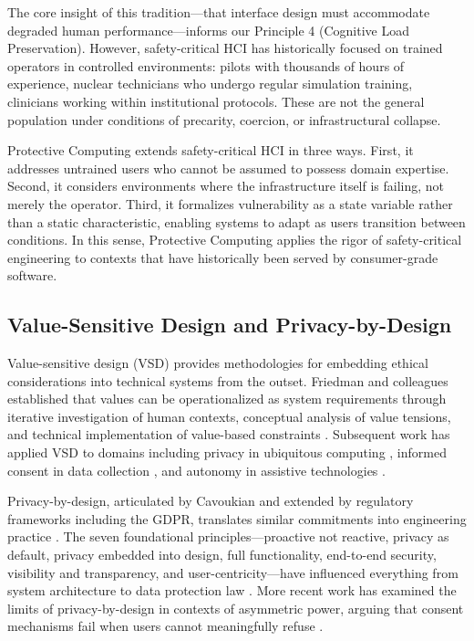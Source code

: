 \documentclass[acmsmall,review]{acmart}
\begin{document}
The core insight of this tradition---that interface design must accommodate degraded human performance---informs our Principle 4 (Cognitive Load Preservation). However, safety-critical HCI has historically focused on trained operators in controlled environments: pilots with thousands of hours of experience, nuclear technicians who undergo regular simulation training, clinicians working within institutional protocols. These are not the general population under conditions of precarity, coercion, or infrastructural collapse.

Protective Computing extends safety-critical HCI in three ways. First, it addresses untrained users who cannot be assumed to possess domain expertise. Second, it considers environments where the infrastructure itself is failing, not merely the operator. Third, it formalizes vulnerability as a state variable rather than a static characteristic, enabling systems to adapt as users transition between conditions. In this sense, Protective Computing applies the rigor of safety-critical engineering to contexts that have historically been served by consumer-grade software.

\subsection{Value-Sensitive Design and Privacy-by-Design}

Value-sensitive design (VSD) provides methodologies for embedding ethical considerations into technical systems from the outset. Friedman and colleagues established that values can be operationalized as system requirements through iterative investigation of human contexts, conceptual analysis of value tensions, and technical implementation of value-based constraints \cite{Friedman2006,Friedman2019}. Subsequent work has applied VSD to domains including privacy in ubiquitous computing \cite{Shilton2013}, informed consent in data collection \cite{Obar2020}, and autonomy in assistive technologies \cite{vanWynsberghe2015}.

Privacy-by-design, articulated by Cavoukian and extended by regulatory frameworks including the GDPR, translates similar commitments into engineering practice \cite{Cavoukian2009,EuropeanParliament2016}. The seven foundational principles---proactive not reactive, privacy as default, privacy embedded into design, full functionality, end-to-end security, visibility and transparency, and user-centricity---have influenced everything from system architecture to data protection law \cite{Rubinstein2020}. More recent work has examined the limits of privacy-by-design in contexts of asymmetric power, arguing that consent mechanisms fail when users cannot meaningfully refuse \cite{Gurses2018,Richards2023}.
\end{document}

